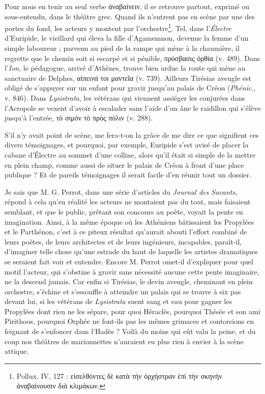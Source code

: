 \documentclass{book}%
\newcommand{\italique}[1]{\textit{#1}}%
\newcommand{\note}[1]{\footnote{#1}}
\begin{document}
Pour nous en tenir au seul verbe ἀναβαίνειν, il se retrouve partout, exprimé ou sous-entendu, dans le théâtre grec. Quand ils n'entrent pas en scène par une des portes du fond, les acteurs y montent par l'orchestre\note{Pollux. IV, 127 : εἰσελθόντες δὲ κατὰ τὴν ὀρχήστραν ἐπὶ τὴν σκηνὴν ἀναβαίνουσιν διὰ κλιμάκων.}. 
Tel, dans l'\italique{Électre} d'Euripide, le vieillard qui éleva la fille d'Agamemnon, devenue la femme d'un simple laboureur ; parvenu au pied de la rampe qui mène à la chaumière, il regrette que le chemin soit si escarpé et si pénible, πρόσβασις ὀρθία (v. 489). 
Dans l'\italique{Ion}, le pédagogue, arrivé d'Athènes, trouve bien ardue la route qui mène au sanctuaire de Delphes, αἰπεινά τοι μαντεῖα (v. 739). 
Ailleurs Tirésias aveugle est obligé de s'appuyer sur un enfant pour gravir jusqu'au palais de Créon (\italique{Phénic}., v. 846). 
Dans \italique{Lysistrata}, les vétérans qui viennent assiéger les conjurées dans l'Acropole se vexent d'avoir à escalader sans l'aide d'un âne le raidillon qui s'élève jusqu'à l'entrée, τὸ σιμὸν τὸ πρὸς πόλιν (v. 288). 

S'il n'y avait point de scène, me fera-t-on la grâce de me dire ce que signifient ces divers témoignages, et pourquoi, par exemple, Euripide s'est avisé de placer la cabane d'Électre au sommet d'une colline, alors qu'il était si simple de la mettre en plein champ, comme aussi de situer le palais de Créon à front d'une place publique ? Et de pareils témoignages il serait facile d'en réunir tout un dossier.

Je sais que M. G. Perrot, dans une série d'articles du \italique{Journal des Savants}, répond à cela qu'en réalité les acteurs ne montaient pas du tout, mais faisaient semblant, et que le public, prêtant son concours au poète, voyait la pente en imagination. 
Ainsi, à la même époque où les Athéniens bâtissaient les Propylées et le Parthénon, c'est à ce piteux résultat qu'aurait abouti l'effort combiné de leurs poètes, de leurs architectes et de leurs ingénieurs, incapables, paraît-il, d'imaginer telle chose qu'une estrade du haut de laquelle les artistes dramatiques se seraient fait voir et entendre. 
Encore M. Perrot omet-il d'expliquer pour quel motif l'acteur, qui s'obstine à gravir sans nécessité aucune cette pente imaginaire, ne la descend jamais. Car enfin si Tirésias, le devin aveugle, cheminant en plein orchestre, s'échine et s'essouffle à atteindre un palais qui se trouve à six pas devant lui, si les vétérans de \italique{Lysistrata} suent sang et eau pour gagner les Propylées dont rien ne les sépare, pour quoi Héraclès, pourquoi Thésée et son ami Pirithoos, pourquoi Orphée ne font-ils pas les mêmes grimaces et contorsions en feignant de s'enfoncer dans l'Hadès ? 
Voilà du moins qui eût valu la peine, et du coup nos théâtres de marionnettes n'auraient eu plus rien à envier à la scène attique. 
\end{document}
